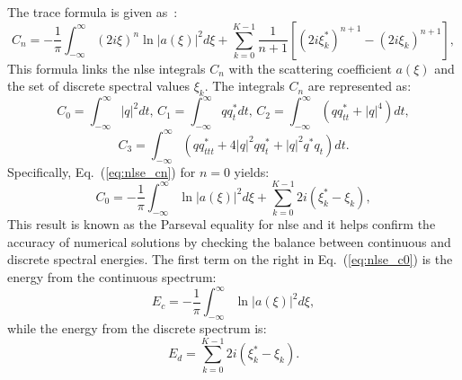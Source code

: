 

The trace formula is given as~\cite{Ablowitz1981}:
\begin{equation}
    C_n = - \frac{1}{\pi} \int_{-\infty}^{\infty} (2i \xi)^n \ln |a(\xi)|^2 d \xi + \sum_{k=0}^{K-1} \frac{1}{n+1} \left[ (2i \xi_k^*)^{n+1} - (2i \xi_k)^{n+1} \right],
    \label{eq:nlse_cn}
\end{equation}
This formula links the \acrshort{nlse} integrals \(C_n\) with the scattering coefficient \(a(\xi)\) and the set of discrete spectral values \(\xi_k\). The integrals \(C_n\) are represented as:
\[
    C_0 = \int_{-\infty}^{\infty} |q|^2 dt, \, C_1 = \int_{-\infty}^{\infty} qq_t^* dt, \, C_2 = \int_{-\infty}^{\infty} (qq_{tt}^* + |q|^4) dt,
\]
\[
    C_3 = \int_{-\infty}^{\infty} (qq^*_{ttt} + 4|q|^2 qq^*_t + |q|^2 q^* q_t) dt.
\]
Specifically, Eq.~(\ref{eq:nlse_cn}) for \(n = 0\) yields:
\begin{equation}
    C_0 = - \frac{1}{\pi} \int_{-\infty}^{\infty} \ln |a(\xi)|^2 d \xi + \sum_{k=0}^{K-1} 2i (\xi_k^* - \xi_k),
    \label{eq:nlse_c0}
\end{equation}
This result is known as the Parseval equality for \acrshort{nlse} and it helps confirm the accuracy of numerical solutions by checking the balance between continuous and discrete spectral energies. The first term on the right in Eq.~(\ref{eq:nlse_c0}) is the energy from the continuous spectrum:
\begin{equation}
    E_c = - \frac{1}{\pi} \int_{-\infty}^{\infty} \ln |a(\xi)|^2 d \xi,
    \label{eq:nlse_e_cont}
\end{equation}
while the energy from the discrete spectrum is:
\begin{equation}
    E_d = \sum_{k=0}^{K-1} 2i (\xi_k^* - \xi_k).
    \label{eq:nlse_e_discr}
\end{equation}



